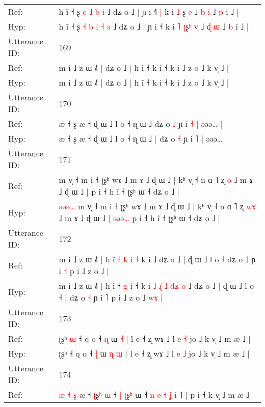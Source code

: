 \documentclass[10pt]{article}
\DeclareRobustCommand{\hl}[1]{{\textcolor{red}{#1}}}
\begin{document}
\begin{longtable}{ll}
Ref: & h ĩ ˧ ʂ\hl{}\hl{} \hl{e} \hl{˩} \hl{b} \hl{i} ˩ dʑ o ˩ | ɲ i ˧\hl{˥}\hl{ }\hl{|} k i \hl{˩} \hl{}ʂ\hl{} \hl{}\hl{e} ˩ \hl{b} \hl{i} ˩ \hl{p} i ˩ |
 \\
Hyp: & h ĩ ˧ ʂ\hl{ }\hl{˧} \hl{b} \hl{i} \hl{˧} \hl{ə} ˩ dʑ o ˩ | ɲ i ˧\hl{}\hl{}\hl{} k i \hl{˥} \hl{ʈ}ʂ\hl{ʰ} \hl{v}\hl{̩} ˩ \hl{ɖ} \hl{ɯ} ˩ \hl{b} i ˩ |
 \\
\midrule
Utterance ID: & 169 \\
Ref: & m i ˩ z ɯ ˩˥ | dʑ o ˩ | h ĩ ˧ k i ˧ k i ˩ z o ˩ k v̩ ˩ |
 \\
Hyp: & m i ˩ z ɯ ˩˥ | dʑ o ˩ | h ĩ ˧ k i ˧ k i ˩ z o ˩ k v̩ ˩ |
 \\
\midrule
Utterance ID: & 170 \\
Ref: & æ ˧ ʂ æ ˧ ɖ ɯ ˩ l o ˧ ɳ ɯ ˩\hl{}\hl{} dʑ o \hl{˩} ɲ i \hl{˧} | əəə…\hl{ }\hl{|}
 \\
Hyp: & æ ˧ ʂ æ ˧ ɖ ɯ ˩ l o ˧ ɳ ɯ ˩\hl{ }\hl{|} dʑ o \hl{˧} ɲ i \hl{˥} | əəə…\hl{}\hl{}
 \\
\midrule
Utterance ID: & 171 \\
Ref: & \hl{}\hl{}\hl{}\hl{}\hl{}m v̩ ˧ m i ˧ ʈʂʰ wɤ ˩ m ɤ ˩ ɖ ɯ ˩ | kʰ v̩ ˧ n ɑ ˥ ʐ \hl{}\hl{o} ˩ m ɤ ˩ ɖ ɯ ˩ |\hl{}\hl{}\hl{}\hl{}\hl{} p i ˧ h ĩ ˧ ʈʂʰ ɯ ˧ dʑ o ˩ |
 \\
Hyp: & \hl{ə}\hl{ə}\hl{ə}\hl{…}\hl{ }m v̩ ˧ m i ˧ ʈʂʰ wɤ ˩ m ɤ ˩ ɖ ɯ ˩ | kʰ v̩ ˧ n ɑ ˥ ʐ \hl{w}\hl{ɤ} ˩ m ɤ ˩ ɖ ɯ ˩ |\hl{ }\hl{ə}\hl{ə}\hl{ə}\hl{…} p i ˧ h ĩ ˧ ʈʂʰ ɯ ˧ dʑ o ˩ |
 \\
\midrule
Utterance ID: & 172 \\
Ref: & m i ˩ z ɯ ˩˥ | h ĩ ˧ \hl{k} i ˧ k i\hl{}\hl{}\hl{}\hl{}\hl{}\hl{}\hl{}\hl{}\hl{}\hl{}\hl{}\hl{} ˩ dʑ o ˩ | ɖ ɯ ˩ l o ˧\hl{}\hl{} dʑ o \hl{˩} ɲ i \hl{˧} p i ˩ z o ˩\hl{}\hl{}\hl{} |
 \\
Hyp: & m i ˩ z ɯ ˩˥ | h ĩ ˧ \hl{g} i ˧ k i\hl{ }\hl{˩}\hl{ }\hl{ɻ}\hl{̍}\hl{ }\hl{˩}\hl{ }\hl{d}\hl{ʑ}\hl{ }\hl{o} ˩ dʑ o ˩ | ɖ ɯ ˩ l o ˧\hl{ }\hl{|} dʑ o \hl{˧} ɲ i \hl{˥} p i ˩ z o ˩\hl{ }\hl{w}\hl{ɤ} |
 \\
\midrule
Utterance ID: & 173 \\
Ref: & ʈʂʰ\hl{ }\hl{ɯ} ˧ q o ˧ \hl{ɳ} ɯ\hl{}\hl{} \hl{˧} | l e ˧ ʐ wɤ ˩ l e \hl{˧} jo ˩ k v̩ ˩ m æ ˩ |
 \\
Hyp: & ʈʂʰ\hl{}\hl{} ˧ q o ˧ \hl{ɭ} ɯ\hl{ }\hl{ɳ} \hl{ɯ} | l e ˧ ʐ wɤ ˩ l e \hl{˩} jo ˩ k v̩ ˩ m æ ˩ |
 \\
\midrule
Utterance ID: & 174 \\
Ref: & \hl{æ}\hl{ }\hl{˧}\hl{ }\hl{ʂ} æ ˧ \hl{ʈ}ʂ\hl{ʰ} \hl{ɯ} ˧\hl{ }\hl{|} \hl{ʈ}ʂ\hl{ʰ} ɯ ˧ \hl{n} \hl{e}\hl{ }\hl{˧} \hl{ʝ} \hl{i}\hl{ }˥ | p i ˧ k v̩ ˩ m æ ˩ |

\end{longtable}
\end{document}
